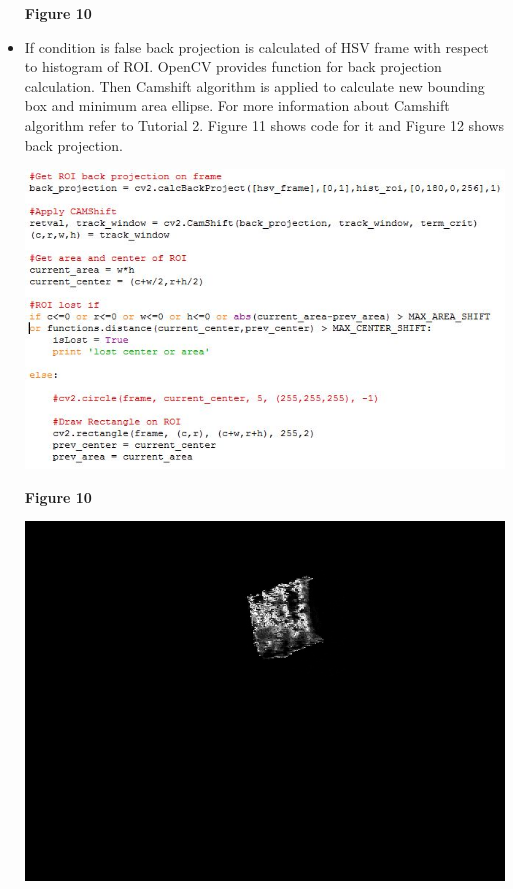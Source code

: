 \documentclass[11pt,a4paper]{article}
\begin{document}
\begin{itemize}
\begin{center}
				 \end{center}
				 \begin{center}
				 	\textbf{Figure 10}
				 \end{center}
			 \item If condition is false back projection is calculated of HSV frame with respect to histogram of ROI. OpenCV provides function for back projection calculation. Then Camshift algorithm is applied to calculate new bounding box and minimum area ellipse. For more information about Camshift algorithm refer to Tutorial 2. Figure 11 shows code for it and Figure 12 shows back projection.
				 \begin{center}
				 	\includegraphics[scale=0.8]{camshift.JPG}
				 \end{center}
				 \begin{center}
				 	\textbf{Figure 10}
				 \end{center}
				 \begin{center}
				 	\includegraphics[scale=0.6]{back_projection.JPG}

\end{center}
\end{itemize}
\end{document}
